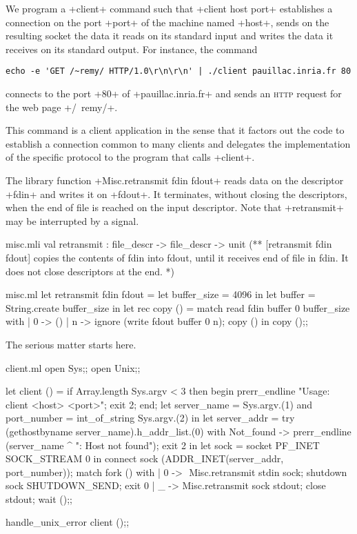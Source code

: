 We program a \ml+client+ command such that \ml+client host port+
establishes a connection on the port \ml+port+ of the machine named
\ml+host+, sends on the resulting socket the data it reads on its
standard input and writes the data it receives on its standard output.
For instance, the command
\begin{lstlisting}
echo -e 'GET /~remy/ HTTP/1.0\r\n\r\n' | ./client pauillac.inria.fr 80
\end{lstlisting}
connects to the port \ml+80+ of \ml+pauillac.inria.fr+ and sends an
\textsc{http} request for the web page \ml+/~remy/+.

This command is a  client application in the sense
that it factors out the code to establish a connection common to many
clients and delegates the implementation of the specific protocol to
the program that calls \ml+client+.

The library function \ml+Misc.retransmit fdin fdout+ reads data on the
descriptor \ml+fdin+ and writes it on \ml+fdout+. It terminates,
without closing the descriptors, when the end of file is reached on
the input descriptor. Note that \ml+retransmit+ may be interrupted by
a signal.
\begin{codefile}{misc.mli}
val retransmit : file_descr -> file_descr -> unit
(** [retransmit fdin fdout] copies the contents of fdin into fdout, until
it receives end of file in fdin. It does not close descriptors at the
end. *)
\end{codefile}
\begin{listingcodefile}{misc.ml}
let retransmit fdin fdout =
  let buffer_size = 4096 in
  let buffer = String.create buffer_size in
  let rec copy () = match read fdin buffer 0 buffer_size with
    | 0 -> ()
    | n -> ignore (write fdout buffer 0 n); copy () 
  in
  copy ();;
\end{listingcodefile}
The serious matter starts here.
\begin{listingcodefile}[style=numbers]{client.ml}
open Sys;;
open Unix;;

let client () =
  if Array.length Sys.argv < 3 then begin
    prerr_endline "Usage: client <host> <port>";
    exit 2;
  end;
  let server_name = Sys.argv.(1)
  and port_number = int_of_string Sys.argv.(2) in
  let server_addr =
    try (gethostbyname server_name).h_addr_list.(0)
    with Not_found ->
      prerr_endline (server_name ^ ": Host not found");
      exit 2 in
  let sock = socket PF_INET SOCK_STREAM 0 in
  connect sock (ADDR_INET(server_addr, port_number));
  match fork () with
  | 0 -> $\label{prog:add_signal_ignore}$
      Misc.retransmit stdin sock;
      shutdown sock SHUTDOWN_SEND;
      exit 0
  | _ ->
      Misc.retransmit sock stdout;
      close stdout;
      wait ();;

handle_unix_error client ();;
\end{listingcodefile}

